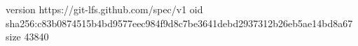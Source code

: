 version https://git-lfs.github.com/spec/v1
oid sha256:c83b0874515b4bd9577eec984f9d8c7be3641debd2937312b26eb5ae14bd8a67
size 43840
